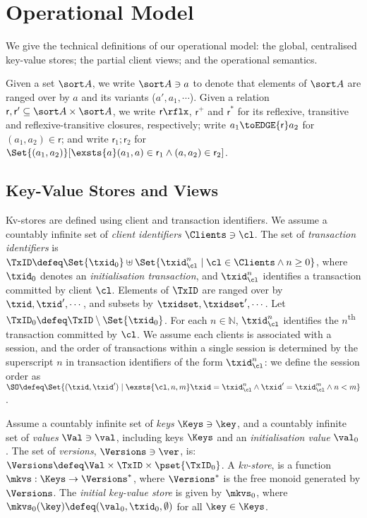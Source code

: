 \section{Operational Model}
\label{sec:model}

We give the technical definitions of our operational model: 
the global, centralised key-value stores; the partial client views;  and the
operational semantics. 

Given a set $\sort A$, we write $\sort A \ni a$ to denote that elements of $\sort A$ are ranged over by $a$ and its variants (\eg $a', a_1, \cdots$). 
Given a relation $\mathsf r, \mathsf r' \subseteq \sort A \times \sort A$,
we write $\mathsf r\rflx$, $\mathsf r^+$ and $\mathsf r^*$ for its reflexive, transitive and reflexive-transitive closures, respectively;
write $a_1 \toEDGE{\mathsf r} a_2$ for $(a_1, a_2) \in \mathsf r$;
and write \( \mathsf r_1 ; \mathsf r_2\) for \( \Set{(a_1,a_2)}[\exsts{a} (a_1,a) \in \mathsf r_1 \land (a,a_2) \in \mathsf r_2]\).

\subsection{Key-Value Stores and Views}
\label{subsec:kvstores}
\label{sec:mkvs-view}
Kv-stores are defined using client and transaction identifiers.
We assume a countably infinite set of \emph{client identifiers} $\Clients \ni \cl$. 
The set of \emph{transaction identifiers} is  
$\TxID \defeq  \Set{\txid_{0}} \uplus \Set{ \txid_{\cl}^{n} \mid \cl
  \in \Clients \land n \geq 0 }$, 
where  $\txid_0$ denotes  an \emph{initialisation transaction}, 
and $\txid_{\cl}^{n}$ identifies a transaction committed by client $\cl$. 
Elements of $\TxID$ are ranged over by
$\txid, \txid', \cdots$, and subsets by $\txidset, \txidset', \cdots$. 
Let $\TxID_{0} \defeq \TxID \setminus \Set{\txid_0}$. 
For each $n \in \mathbb{N}$, $\txid_{\cl}^{n}$ identifies the $n$\textsuperscript{th} transaction  committed by $\cl$.
We assume each clients is associated with a session, 
and the order of transactions within a single session is determined by the superscript 
$n$ in transaction identifiers of the form $\txid_{\cl}^{n}$: we define the session order 
as 
$\SO \defeq \Set{ (\txid, \txid') \mid \exsts{ \cl, n,m } \txid =
  \txid_{\cl}^{n} \land \txid' = \txid_{\cl}^{m} \land n < m}$.

\begin{definition}[Kv-stores]
\label{def:his_heap}
\label{def:mkvs}
Assume a countably infinite set of \emph{keys} $\Keys \ni \key$, 
and a countably infinite set of  \emph{values} $\Val \ni \val$, 
including keys \( \Keys \) and an \emph{initialisation value} $\val_0$.
The set of \emph{versions}, $\Versions \ni \ver$, is: $\Versions \defeq \Val \times \TxID \times \pset{\TxID_{0}}$. 
A \emph{kv-store}, 
is a function $\mkvs: \Keys \to \Versions^{\ast}$, 
where $\Versions^{\ast}$ is the free monoid generated by $\Versions$. 
The \emph{initial key-value store} is given by $\mkvs_0$, where 
$\mkvs_{0}(\key)\defeq  (\val_0, \txid_0, \emptyset)$ for
all $\key \in \Keys$.
\end{definition}

